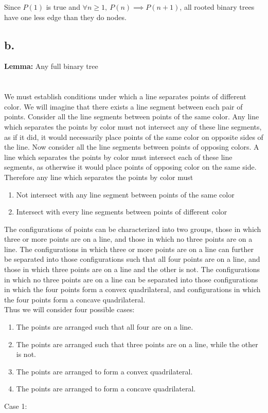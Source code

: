 \documentclass[11pt]{article}
\begin{document}
Since $P(1)$ is true and $\forall n \geq 1,\  P(n) \implies P(n+1)$, all rooted binary trees have one less edge than they do nodes.

\subsection*{b.}
\textbf{Lemma: } Any full binary tree 


\section{}
We must establish conditions under which a line separates points of different color. We will imagine that there exists a line segment between each pair of points. 
Consider all the line segments between points of the same color. Any line which separates the points by color must not intersect any of these line segments, as if it did, it would necessarily place points of the same color on opposite sides of the line. Now consider all the line segments between points of opposing colors. A line which separates the points by color must intersect each of these line segments, as otherwise it would place points of opposing color on the same side. Therefore any line which separates the points by color must
\begin{enumerate}
    \item Not intersect with any line segment between points of the same color
    \item Intersect with every line segments between points of different color
\end{enumerate}

The configurations of points can be characterized into two groups, those in which three or more points are on a line, and those in which no three points are on a line.
The configurations in which three or more points are on a line can further be separated into those configurations such that all four points are on a line, and those in which three points are on a line and the other is not. 
The configurations in which no three points are on a line can be separated into those configurations in which the four points form a convex quadrilateral, and configurations in which the four points form a concave quadrilateral. \\ 
Thus we will consider four possible cases: 
\begin{enumerate}
    \item The points are arranged such that all four are on a line. 
    \item The points are arranged such that three points are on a line, while the other is not. 
    \item The points are arranged to form a convex quadrilateral. 
    \item The points are arranged to form a concave quadrilateral.  
\end{enumerate}


Case 1:
\end{document}

